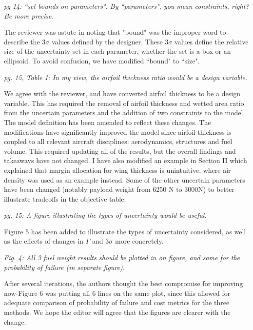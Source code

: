 \documentclass[11pt]{article}
\begin{document}
    \textit{pg 14: ``set bounds on parameters". By ``parameters", you mean constraints, right? Be more precise.}

    The reviewer was astute in noting that "bound" was the improper word to describe the $3\sigma$ values
    defined by the designer. These $3\sigma$ values define the relative size
    of the uncertainty set in each parameter, whether the set is a box or an ellipsoid.
    To avoid confusion, we have modified ``bound" to ``size".
    \bigskip

    \textit{pg. 15, Table 1: In my view, the airfoil thickness ratio would be a design variable.}

    We agree with the reviewer, and have converted airfoil thickness to be a design variable.
    This has required the removal of airfoil thickness and wetted area ratio from the uncertain parameters
    and the addition of two constraints to the model. The model definition has been
    amended to reflect these changes.
    The modifications have significantly improved the model since
    airfoil thickness is coupled to all relevant aircraft disciplines: aerodynamics, structures and
    fuel volume. This required updating all of the results,
    but the overall findings and takeaways have not changed. I have also
    modified an example in Section II
    which explained that margin allocation for wing thickness
    is unintuitive, where air density was used as an example instead.
    Some of the other uncertain parameters have been changed (notably
    payload weight from 6250 N to 3000N) to better illustrate tradeoffs in the objective
    table.
    \bigskip

    \textit{pg. 15: A figure illustrating the types of uncertainty would be useful.}

    Figure 5 has been added to illustrate the types of uncertainty considered,
    as well as the effects of changes in $\Gamma$ and $3\sigma$ more concretely.
    \bigskip

    \textit{Fig. 4: All 3 fuel weight results should be plotted in on figure,
    and same for the probability of failure (in separate figure).}

    After several iterations, the authors thought the best compromise for improving now-Figure 6
    was putting
    all 6 lines on the same plot, since this allowed for adequate comparison of probability of
    failure and cost metrics for the three methods. We hope the editor will agree that
    the figures are clearer with the change.
    \bigskip
\end{document}

